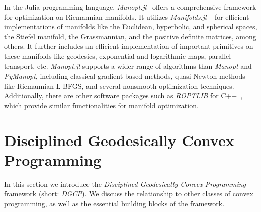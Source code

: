 \documentclass[twoside,11pt]{article}
\begin{document}
In the Julia programming language, \textsl{Manopt.jl}~\citep{manoptjl} offers a comprehensive framework for optimization on Riemannian manifolds. It utilizes \textsl{Manifolds.jl} ~\citep{axen2023manifolds} for efficient implementations of manifolds like the Euclidean, hyperbolic, and spherical spaces, the Stiefel manifold, the Grassmannian, and the positive definite matrices, among others. It further includes an efficient implementation of important primitives on these manifolds like geodesics, exponential and logarithmic maps, parallel transport, etc. \textsl{Manopt.jl} supports a wider range of algorithms than \textsl{Manopt} and \textsl{PyManopt}, including classical gradient-based methods, quasi-Newton methods like Riemannian L-BFGS, and several nonsmooth optimization techniques. 
Additionally, there are other software packages such as \textsl{ROPTLIB} for C++~\citep{roptlib}, which provide similar functionalities for manifold optimization.



\section{Disciplined Geodesically Convex Programming}
In this section we introduce the \emph{Disciplined Geodesically Convex Programming} framework (short: \emph{DGCP}). We discuss the relationship to other classes of convex programming, as well as the essential building blocks of the framework.
\end{document}
